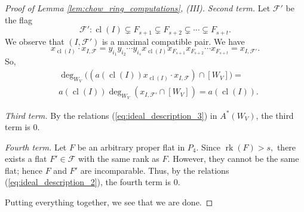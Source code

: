 \documentclass{amsart}
\theoremstyle{plain}
\theoremstyle{definition}
\newcommand{\rk}{\operatorname{rk}}
\newcommand{\cl}{\operatorname{cl}}
\begin{document}
\begin{proof}[Proof of Lemma \ref{lem:chow_ring_computations}, (III)]
\noindent
\textit{Second term.}
Let $\mathscr{F}'$ be the flag
\[\mathscr{F}':\cl(I) \subsetneq  F_{s+1} \subsetneq F_{s+2} \subsetneq \cdots \subsetneq F_{s+t}.\]
We observe that $(I, \mathscr{F}')$ is a maximal compatible pair. We have
\[x_{\cl(I)} \cdot x_{I, \mathscr{F}} = y_{i_1}y_{i_2}\cdots y_{i_s} x_{\cl(I)} x_{F_{s+1}}x_{F_{s+2}}\cdots x_{F_{s+t}} = x_{I,\mathscr{F}'}.\]
So,
\begin{equation}
\begin{split}
& \deg_{W_V}\Big((a(\cl(I))x_{\cl(I)} \cdot x_{I, \mathscr{F}}) \cap [W_V] \Big) = \\ & a(\cl(I)) \deg_{W_V}(x_{I, \mathscr{F}'} \cap [W_V]) = a(\cl(I)).
\end{split}
\end{equation}

\noindent
\textit{Third term.} By the relations (\ref{eq:ideal_description_3}) in $A^*(W_V)$, the third term is 0.

\noindent
\textit{Fourth term.} Let $F$ be an arbitrary proper flat in $P_4.$ Since $\rk(F) > s,$ there exists a flat $F' \in \mathscr{F}$ with the same rank as $F$. However, they cannot be the same flat; hence $F$ and $F'$ are incomparable. Thus, by the relations (\ref{eq:ideal_description_2}), the fourth term is 0.

Putting everything together, we see that we are done.
\end{proof}
\medskip
\printbibliography
\end{document}
